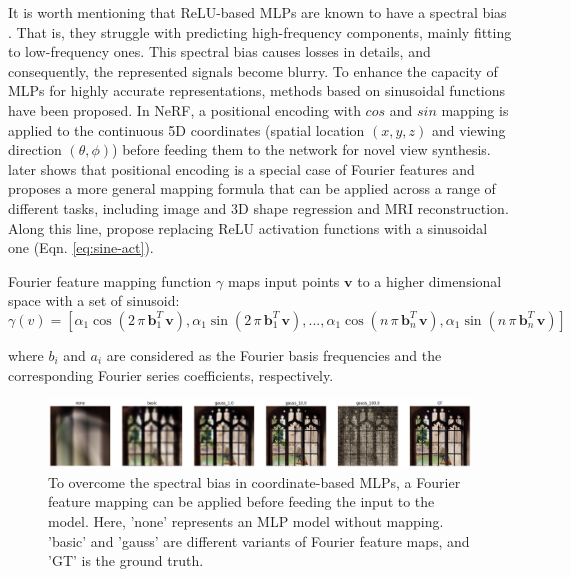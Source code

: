 It is worth mentioning that ReLU-based MLPs are known to have a spectral bias \cite{rahaman2019spectral}. That is, they struggle with predicting high-frequency components, mainly fitting to low-frequency ones. This spectral bias causes losses in details, and consequently, the represented signals become blurry. To enhance the capacity of MLPs for highly accurate representations, methods based on sinusoidal functions have been proposed. In NeRF, a positional encoding with $cos$ and $sin$ mapping is applied to the continuous 5D coordinates (spatial location $(x, y, z)$ and viewing direction $(\theta, \phi)$) before feeding them to the network for novel view synthesis. \citeauthor{ffn} \cite{ffn} later shows that positional encoding is a special case of Fourier features \cite{rahimi2007random} and proposes a more general mapping formula that can be applied across a range of different tasks, including image and 3D shape regression and MRI reconstruction. Along this line, \citeauthor{sitzmann2020siren} \cite{sitzmann2020siren} propose replacing ReLU activation functions with a sinusoidal one (Eqn. \ref{eq:sine-act}).

Fourier feature mapping function $\gamma$ maps input points $\mathbf{v}$ to a higher dimensional space with a set of sinusoid:
\begin{equation}
\gamma(v) = [\alpha_1 \cos(2 \, \pi \, \mathbf{b}^T_1 \, \mathbf{v}), \alpha_1 \sin(2 \, \pi \, \mathbf{b}^T_1 \, \mathbf{v}), ..., \alpha_1 \cos(n \, \pi \, \mathbf{b}^T_n \, \mathbf{v}), \alpha_1 \sin(n \, \pi \, \mathbf{b}^T_n \, \mathbf{v})]
\label{eq:ffn}
\end{equation}

where $b_i$ and $a_i$ are considered as  the Fourier basis frequencies and the corresponding Fourier series coefficients, respectively.

\begin{figure}[ht]
  \centering
   \includegraphics[width=\linewidth]{Images/FFN.png}
   \caption{To overcome the spectral bias in coordinate-based MLPs, a Fourier feature mapping \cite{ffn} can be applied before feeding the input to the model. Here, 'none' represents an MLP model without mapping. 'basic' and 'gauss' are different variants of Fourier feature maps, and 'GT' is the ground truth.}
   \label{fig:ffn}
\end{figure}

